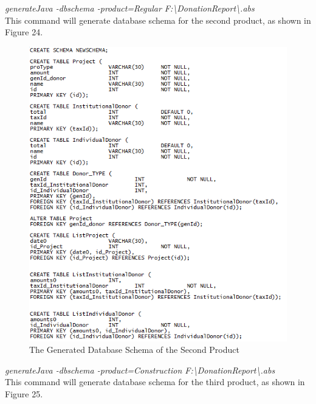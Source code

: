 \documentclass[runningheads,a4paper]{llncs}
\begin{document}
\emph{generateJava -dbschema -product=Regular F:\textbackslash DonationReport\textbackslash *.abs}\\

This command will generate database schema for the second product, as shown in Figure 24.\\

\begin{figure}
	\centering
	\includegraphics[scale=0.7]{create2.png}
	\caption{The Generated Database Schema of the Second Product}
	\label{Figure 24}
\end{figure}

\emph{generateJava -dbschema -product=Construction F:\textbackslash DonationReport\textbackslash *.abs}\\

This command will generate database schema for the third product, as shown in Figure 25.\\
\end{document}
